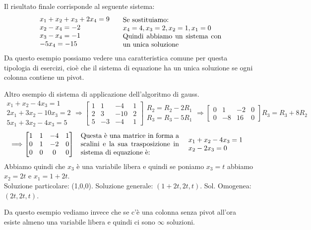Il risultato finale corrisponde al seguente sistema:
\[
\begin{array}{l}
x_1 + x_2 + x_3 + 2x_4 = 9\\
x_2 - x_4 = -2\\
x_3 - x_4 = -1\\
-5x_4 = -15
\end{array}
\hspace{.5cm}
\parbox{5cm}{Se sostituiamo: \\$x_4 = 4, x_3 = 2, x_2 = 1, x_1 = 0$\\Quindi abbiamo un sistema con un unica soluzione}
\]
Da questo esempio possiamo vedere una caratteristica comune per questa tipologia di esercizi, cioè che il sistema di equazione ha un unica soluzione se ogni colonna contiene un pivot.

\begin{example}
Altro esempio di sistema di applicazione dell'algoritmo di gauss.
\[
    \begin{array}{l}
    x_1 + x_2 - 4x_3 = 1\\
    2x_1 + 3x_2 - 10x_3 = 2\\
    5x_1 + 3x_2 - 4x_3 = 5
    \end{array}
    \Longrightarrow
    \begin{bmatrix}
    1 & 1 & -4 & 1\\
    2 & 3 & -10 & 2\\
    5 & -3 & -4 & 1
    \end{bmatrix}
    \begin{array}{r}
    R_2 = R_2 - 2R_1\\
    R_3 = R_3 - 5R_1
    \end{array}
    \Longrightarrow
    \begin{bmatrix}
    0 & 1 & -2 & 0\\
    0 & -8 & 16 & 0
    \end{bmatrix}
    R_3 = R_3 + 8R_2
\]
\[
    \Longrightarrow
    \begin{bmatrix}
    1 & 1 & -4 & 1\\
    0 & 1 & -2 & 0\\
    0 & 0 & 0 & 0
    \end{bmatrix}
    \hspace{.3cm}
    \parbox{5cm}{Questa è una matrice in forma a scalini e la sua trasposizione in sistema di equazione è:}
    \hspace{.3cm}
    \begin{array}{l}
    x_1 + x_2 - 4x_3 = 1\\
    x_2 - 2x_3 = 0
    \end{array}
\]
Abbiamo quindi che $x_3$ è una variabile libera e quindi se poniamo $x_3 = t$ abbiamo $x_2 = 2t$ e $x_1 = 1+2t$.\\
Soluzione particolare: (1,0,0). Soluzione generale: $(1+2t, 2t, t)$. Sol. Omogenea: $(2t, 2t, t)$.
\end{example}
\hspace{-15pt}Da questo esempio vediamo invece che se c'è una colonna senza pivot all'ora esiste almeno una variabile libera e quindi ci sono $\infty$ soluzioni.

